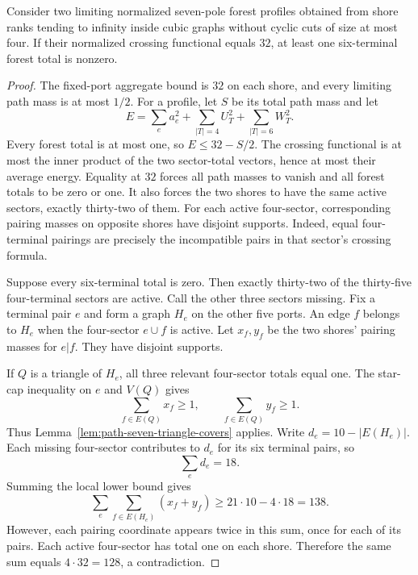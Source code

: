 \begin{proposition}
\label{prop:path-seven-critical-six-sector}
Consider two limiting normalized seven-pole forest profiles obtained from shore ranks tending to infinity inside cubic graphs without cyclic cuts of size at most four.
If their normalized crossing functional equals $32$, at least one six-terminal forest total is nonzero.
\end{proposition}

\begin{proof}
The fixed-port aggregate bound is $32$ on each shore, and every limiting path mass is at most $1/2$.
For a profile, let $S$ be its total path mass and let
\[
 E=\sum_e a_e^2+\sum_{|T|=4}U_T^2+\sum_{|T|=6}W_T^2.
\]
Every forest total is at most one, so $E\le32-S/2$.
The crossing functional is at most the inner product of the two sector-total vectors, hence at most their average energy.
Equality at $32$ forces all path masses to vanish and all forest totals to be zero or one.
It also forces the two shores to have the same active sectors, exactly thirty-two of them.
For each active four-sector, corresponding pairing masses on opposite shores have disjoint supports.
Indeed, equal four-terminal pairings are precisely the incompatible pairs in that sector's crossing formula.

Suppose every six-terminal total is zero.
Then exactly thirty-two of the thirty-five four-terminal sectors are active.
Call the other three sectors missing.
Fix a terminal pair $e$ and form a graph $H_e$ on the other five ports.
An edge $f$ belongs to $H_e$ when the four-sector $e\cup f$ is active.
Let $x_f,y_f$ be the two shores' pairing masses for $e|f$.
They have disjoint supports.

If $Q$ is a triangle of $H_e$, all three relevant four-sector totals equal one.
The star-cap inequality on $e$ and $V(Q)$ gives
\[
 \sum_{f\in E(Q)}x_f\ge1,
 \qquad
 \sum_{f\in E(Q)}y_f\ge1.
\]
Thus Lemma~\ref{lem:path-seven-triangle-covers} applies.
Write $d_e=10-|E(H_e)|$.
Each missing four-sector contributes to $d_e$ for its six terminal pairs, so
\[
 \sum_e d_e=18.
\]
Summing the local lower bound gives
\[
 \sum_e\sum_{f\in E(H_e)}(x_f+y_f)
 \ge21\cdot10-4\cdot18=138.
\]
However, each pairing coordinate appears twice in this sum, once for each of its pairs.
Each active four-sector has total one on each shore.
Therefore the same sum equals $4\cdot32=128$, a contradiction.
\end{proof}

